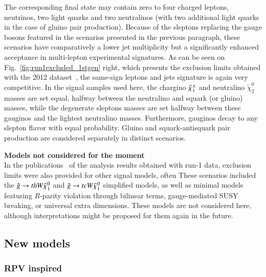 The corresponding final state may contain zero to four charged leptons, neutrinos, two light quarks and two neutralinos 
(with two additional light quarks in the case of gluino pair production). 
Because of the sleptons replacing the gauge bosons featured in the scenarios presented in the previous paragraph, 
these scenarios have comparatively a lower jet multiplicity but a significantly enhanced acceptance in multi-lepton experimental signatures. 
As can be seen on Fig.~\ref{fig:run1excluded_1stgen} right, which presents the exclusion limits obtained with the 2012 dataset~\cite{DraftSquarkGluinoSummaryPaper}, 
the same-sign leptons and jets signature is again very competitive. 
In the signal samples used here, the chargino $\tilde{\chi}_{1}^{\pm}$ and neutralino $\tilde{\chi}_{2}^{0}$ masses are set equal, 
halfway between the neutralino and squark (or gluino) masses, 
while the degenerate sleptons masses are set halfway between these gauginos and the lightest neutralino masses. 
Furthermore, gauginos decay to any slepton flavor with equal probability. 
Gluino and squark-antisquark pair production are considered separately in distinct scenarios. 
\\
\par{\bf Models not considered for the moment\\}
In the publications~\cite{paperSS3L,DraftSquarkGluinoSummaryPaper} of the analysis results obtained with run-1 data, 
exclusion limits were also provided for other signal models, often 
These scenarios included the $\tilde{g} \rightarrow tbW\tilde{\chi}_{1}^{0}$ and $\tilde{g} \rightarrow tcW\tilde{\chi}_{1}^{0}$ simplified models, as well as minimal models featuring 
$R$-parity violation through bilinear terms, gauge-mediated SUSY breaking, or universal extra dimensions. 
These models are not considered here, although interpretations might be proposed for them again in the future. 

\subsection{New models}


\subsubsection{RPV inspired}
\label{subsec:RPVmodel}

